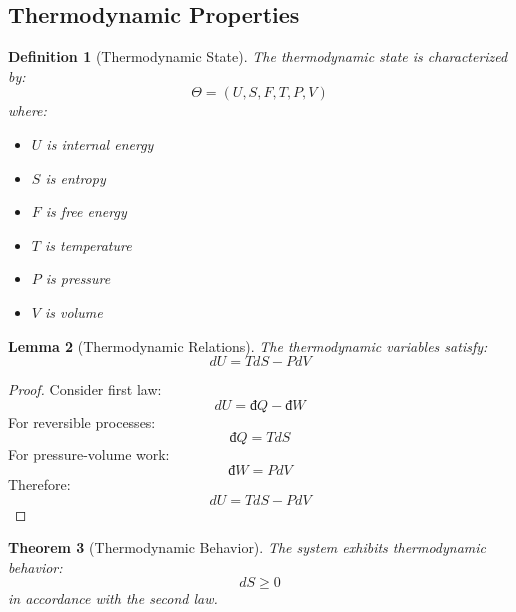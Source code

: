 \documentclass[12pt]{article}
\newtheorem{theorem}{Theorem}[section]
\newtheorem{lemma}[theorem]{Lemma}
\newtheorem{definition}[theorem]{Definition}
\begin{document}
\subsection{Thermodynamic Properties}
\begin{definition}[Thermodynamic State]
The thermodynamic state is characterized by:
\begin{equation}
\Theta = (U,S,F,T,P,V)
\end{equation}
where:
\begin{itemize}
\item $U$ is internal energy
\item $S$ is entropy
\item $F$ is free energy
\item $T$ is temperature
\item $P$ is pressure
\item $V$ is volume
\end{itemize}
\end{definition}
\begin{lemma}[Thermodynamic Relations]
The thermodynamic variables satisfy:
\begin{equation}
dU = TdS - PdV
\end{equation}
\end{lemma}
\begin{proof}
Consider first law:
\begin{equation}
dU = đQ - đW
\end{equation}
For reversible processes:
\begin{equation}
đQ = TdS
\end{equation}
For pressure-volume work:
\begin{equation}
đW = PdV
\end{equation}
Therefore:
\begin{equation}
dU = TdS - PdV
\end{equation}
\end{proof}
\begin{theorem}[Thermodynamic Behavior]
The system exhibits thermodynamic behavior:
\begin{equation}
dS \geq 0
\end{equation}
in accordance with the second law.
\end{theorem}
\end{document}
